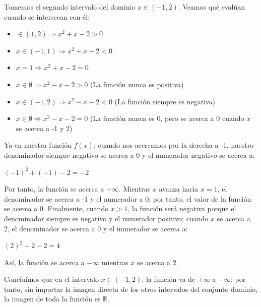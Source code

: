 \documentclass{article}
\begin{document}
\begin{enumerate}
\begin{enumerate}
        Tomemos el segundo intervalo del dominio $x \in (-1, 2)$. Veamos qué evalúan cuando se intersecan con él:
            \begin{itemize}
                \item $\in (1, 2) \Rightarrow x^2 + x - 2 > 0$
                \item $x \in (-1, 1) \Rightarrow x^2 + x - 2 < 0$
                \item $x = 1 \Rightarrow x^2 + x - 2 = 0$
            \end{itemize}
        \vspace{\baselineskip}
            \begin{itemize}
                \item $x \in \emptyset \Rightarrow x^2 - x - 2 > 0$ (La función nunca es positiva)
                \item $x \in (-1, 2) \Rightarrow x^2 - x - 2 < 0$ (La función siempre es negativa)
                \item $x \in \emptyset \Rightarrow x^2 - x - 2 = 0$ (La función nunca es 0, pero se acerca a 0 cuando $x$ se acerca a -1 y 2)
            \end{itemize}
        \vspace{\baselineskip}
        Ya en nuestra función \(f(x)\); cuando nos acercamos por la derecha a -1, nuestro denominador siempre negativo se acerca a 0 y el numerador negativo se acerca a:
        
        $(-1)^2 + (-1) - 2 = -2$
        \vspace{\baselineskip}
        
        Por tanto, la función se acerca a \(+\infty\). Mientras \(x\) avanza hacia \(x = 1\), el denominador se acerca a -1 y el numerador a 0; por tanto, el valor de la función se acerca a 0. Finalmente, cuando \(x > 1\), la función será negativa porque el denominador siempre es negativo y el numerador positivo; cuando \(x\) se acerca a 2, el denominador se acerca a 0 y el numerador se acerca a:
        
        $(2)^2 + 2 - 2 = 4$
        \vspace{\baselineskip}
        
        Así, la función se acerca a \(-\infty\) mientras \(x\) se acerca a 2.
        \vspace{\baselineskip}
        
        Concluimos que en el intervalo \(x \in (-1,2)\), la función va de \(+\infty\) a \(-\infty\); por tanto, sin importar la imagen directa de los otros intervalos del conjunto dominio, la imagen de toda la función es \(\mathbb{R}\).
        \vspace{\baselineskip}


\end{enumerate}
\end{enumerate}
\end{document}
